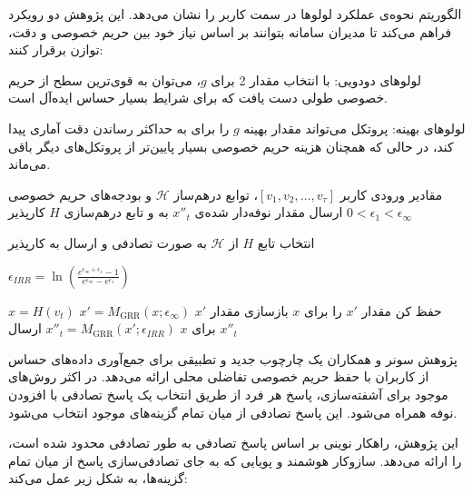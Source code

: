 الگوریتم  نحوه‌ی عملکرد لولوها در سمت کاربر را نشان می‌دهد. این پژوهش دو رویکرد فراهم می‌کند تا مدیران سامانه بتوانند بر اساس نیاز خود بین حریم خصوصی و دقت، توازن برقرار کنند:


 لولوهای دودویی: با انتخاب مقدار 2 برای $g$، می‌توان به قوی‌ترین سطح از حریم خصوصی طولی دست یافت که برای شرایط بسیار حساس ایده‌آل است.

 لولوهای بهینه: پروتکل می‌تواند مقدار بهینه $g$ را برای به حداکثر رساندن دقت آماری پیدا کند، در حالی که همچنان هزینه حریم خصوصی بسیار پایین‌تر از پروتکل‌های دیگر باقی می‌ماند.


 مقادیر ورودی کاربر $[v_1, v_2, \ldots, v_\tau]$، توابع درهم‌ساز $\mathcal{H}$ و بودجه‌های حریم خصوصی $0 < \epsilon_1 < \epsilon_\infty$ 
 ارسال مقدار نوفه‌دار شده‌ی $x''_t$ به و تابع درهم‌سازی $H$ کارپذیر

 انتخاب تابع $H$ از $\mathcal{H}$ به صورت تصادفی و ارسال به کارپذیر

 $\epsilon_{IRR} = \ln \left( \frac{e^{\epsilon_{\infty}+\epsilon_1} - 1}{e^{\epsilon_{\infty}} - e^{\epsilon_1}} \right)$

     $x = H(v_t)$
         $x' = M_{\text{GRR}}(x; \epsilon_\infty)$ 
         حفظ کن مقدار $x'$ را برای $x$
    \Else
         بازسازی مقدار $x'$ برای $x$
    \EndIf
     $x''_t = M_{\text{GRR}}(x'; \epsilon_{IRR})$ 
     ارسال $x''_t$ 
\EndFor




پژوهش سونر و همکاران  یک چارچوب جدید و تطبیقی برای جمع‌آوری داده‌های حساس از کاربران با حفظ حریم خصوصی تفاضلی محلی ارائه می‌دهد. در اکثر روش‌های موجود برای آشفته‌سازی، پاسخ هر فرد از طریق انتخاب یک پاسخ تصادفی با افزودن نوفه همراه می‌شود. این پاسخ تصادفی از میان تمام گزینه‌های موجود انتخاب می‌شود.

این پژوهش، راهکار نوینی بر اساس پاسخ تصادفی به طور تصادفی محدود شده است، را ارائه می‌دهد.  سازوکار هوشمند و پویایی که به جای تصادفی‌سازی پاسخ از میان تمام گزینه‌ها، به شکل زیر عمل می‌کند:

